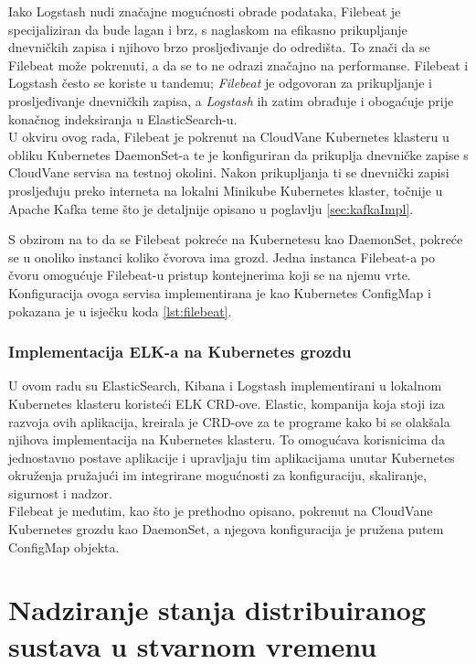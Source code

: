 \documentclass[times, utf8, diplomski]{fer}
\begin{document}
Iako Logstash nudi značajne mogućnosti obrade podataka, Filebeat je specijaliziran da bude lagan i brz, s naglaskom na efikasno prikupljanje dnevničkih zapisa i njihovo brzo prosljeđivanje do odredišta. To znači da se Filebeat može pokrenuti, a da se to ne odrazi značajno na performanse. Filebeat i Logstash često se koriste u tandemu; \emph{Filebeat} je odgovoran za prikupljanje i prosljeđivanje dnevničkih zapisa, a \emph{Logstash} ih zatim obrađuje i obogaćuje prije konačnog indeksiranja u ElasticSearch-u.\\

U okviru ovog rada, Filebeat je pokrenut na CloudVane Kubernetes klasteru u obliku Kubernetes DaemonSet-a te je konfiguriran da prikuplja dnevničke zapise s CloudVane servisa na testnoj okolini. Nakon prikupljanja ti se dnevnički zapisi prosljeđuju preko interneta na lokalni Minikube Kubernetes klaster, točnije u Apache Kafka teme što je detaljnije opisano u poglavlju \ref{sec:kafkaImpl}. 

S obzirom na to da se Filebeat pokreće na Kubernetesu kao DaemonSet, pokreće se u onoliko instanci koliko čvorova ima grozd. Jedna instanca Filebeat-a po čvoru omogućuje Filebeat-u pristup kontejnerima koji se na njemu vrte. Konfiguracija ovoga servisa implementirana je kao Kubernetes ConfigMap i pokazana je u isječku koda \ref{lst:filebeat}.

\subsection{Implementacija ELK-a na Kubernetes grozdu}
\label{sec:elk_impl}

U ovom radu su ElasticSearch, Kibana i Logstash implementirani u lokalnom Kubernetes klasteru koristeći ELK CRD-ove. Elastic, kompanija koja stoji iza razvoja ovih aplikacija, kreirala je CRD-ove za te programe kako bi se olakšala njihova implementacija na Kubernetes klasteru. To omogućava korisnicima da jednostavno postave aplikacije i upravljaju tim aplikacijama unutar Kubernetes okruženja pružajući im integrirane mogućnosti za konfiguraciju, skaliranje, sigurnost i nadzor.\\

Filebeat je međutim, kao što je prethodno opisano, pokrenut na CloudVane Kubernetes grozdu kao DaemonSet, a njegova konfiguracija je pružena putem ConfigMap objekta.

\chapter{Nadziranje stanja distribuiranog sustava u stvarnom vremenu}
\label{sec:streamingMonitoring}
\end{document}
